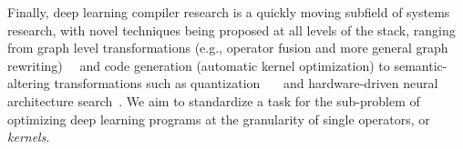 Finally, deep learning compiler research is a quickly moving subfield of systems research, with novel techniques being proposed at all levels of the stack, ranging from graph level transformations (e.g., operator fusion and more general graph rewriting)~\cite{metaflow_sysml19}~\cite{anderson2018optimal} and code generation (automatic kernel optimization) to semantic-altering transformations such as quantization~\cite{blott2018finn}~\cite{zhou2016dorefa}~\cite{fromm2018heterogeneous} and hardware-driven neural architecture search~\cite{Yang_2018_ECCV}.
We aim to standardize a task for the sub-problem of optimizing deep learning programs at the granularity of single operators, or \emph{kernels}.



